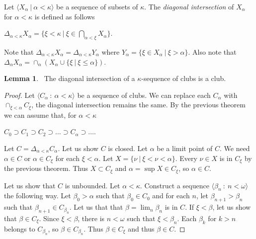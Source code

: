\documentclass[8pt]{article}
\theoremstyle{definition}
\theoremstyle{definition}
\theoremstyle{definition}
\theoremstyle{definition}
\theoremstyle{definition}
\theoremstyle{definition}
\theoremstyle{definition}
\theoremstyle{definition}
\newtheorem{lemma}{Lemma}[section]
\theoremstyle{definition}
\theoremstyle{definition}
\theoremstyle{definition}
\theoremstyle{definition}
\theoremstyle{definition}
\theoremstyle{definition}
\theoremstyle{question}
\begin{document}
Let $\langle X_{\alpha} \: | \: \alpha < \kappa \rangle$ be a sequence of subsets of $\kappa$.
The \emph{diagonal intersection} of $X_{\alpha}$ for $\alpha < \kappa$ is defined as follows
\begin{center}
  $\Delta_{\alpha < \kappa} X_{\alpha} = \{ \xi < \kappa \: | \: \xi \in \bigcap \limits_{\alpha < \xi} X_{\alpha} \}$.
\end{center}

Note that $\Delta_{\alpha < \kappa} X_{\alpha} = \Delta_{\alpha < \kappa} Y_{\alpha}$
where $Y_{\alpha} = \{ \xi \in X_{\alpha} \: | \: \xi > \alpha \}$. Also note that
$\Delta_{\alpha} X_{\alpha} = \cap_{\alpha} (X_{\alpha} \cup \{ \xi \: |\: \xi \leq \alpha \})$.

\begin{lemma}~\label{diag:lemma}
  The diagonal intersection of a $\kappa$-sequence of clubs is a club.
\end{lemma}

\begin{proof}
  Let $\langle C_{\alpha} \: : \: \alpha < \kappa \rangle$ be a sequence of clubs.
  We can replace each $C_{\alpha}$ with $\cap_{\xi < \alpha} C_{\xi}$, the diagonal intersection
  remains the same. By the previous theorem we can assume that, for $\alpha < \kappa$
  \begin{center}
    $C_0 \supset C_1 \supset C_2 \supset \ldots \supset C_{\alpha} \supset \dots$.
  \end{center}

  Let $C = \Delta_{\alpha < \kappa} C_{\alpha}$. Let us show $C$ is closed.
  Let $\alpha$ be a limit point of $C$. We need $\alpha \in C$ or $\alpha \in C_{\xi}$ for each $\xi < \alpha$.
  Let $X = \{ \nu \: | \: \xi < \nu < \alpha \}$. Every $\nu \in X$ is in $C_{\xi}$ by the previous theorem.
  Thus $X \subset C_{\xi}$ and $\alpha = \sup X \in C_{\xi}$, so $\alpha \in C$.

  Let us show that $C$ is unbounded. Let $\alpha < \kappa$. Construct a sequence 
  $\langle \beta_n \: : \: n < \omega \rangle$ the following way. Let $\beta_0 > \alpha$
  such that $\beta_0 \in C_0$ and for each $n$, let $\beta_{n + 1} > \beta_n$
  such that $\beta_{n + 1} \in C_{\beta_n}$. Let us that that $\beta = \lim_{n} \beta_n$ is in $C$.
  If $\xi < \beta$, let us show that $\beta \in C_{\xi}$. Since $\xi < \beta$, there is $n < \omega$
  such that $\xi < \beta_n$. Each $\beta_k$ for $k > n$ belongs to $C_{\beta_n}$, so $\beta \in C_{\beta_n}$.
  Thus $\beta \in C_{\xi}$ and thus $\beta \in C$.
\end{proof}
\end{document}
